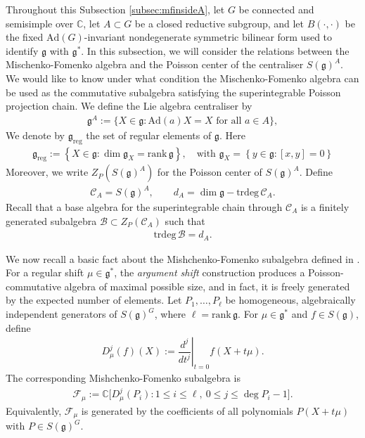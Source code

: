 \documentclass[11pt,reqno]{amsart}
\newtheorem*{theorem A}{Main Theorem A}
\newtheorem*{theorem B}{Main Theorem B}
\newtheorem*{theorem C}{Main Theorem C}
\newtheorem*{theorem D}{Main Theorem D}
\theoremstyle{definition}
\theoremstyle{plain}
\theoremstyle{conclusion}
\begin{document}
Throughout this Subsection \ref{subsec:mfinsideA}, let $G$ be connected and semisimple over $\mathbb{C}$, let $A \subset G$ be a closed reductive subgroup, and let $B (\cdot,\cdot)$ be the fixed $\mathrm{Ad}(G)$-invariant nondegenerate symmetric bilinear form used to identify $\mathfrak{g}$ with $\mathfrak{g}^*$. In this subsection, we will consider the relations between the  Mischenko-Fomenko algebra and the Poisson center of the centraliser $S(\mathfrak{g})^A$. We would like to know under what condition the Mischenko-Fomenko algebra can be used as the commutative subalgebra satisfying the superintegrable Poisson projection chain. We define the Lie algebra centraliser by  \begin{align*}
\mathfrak{g}^A := \{X \in \mathfrak{g} : \mathrm{Ad}(a)X = X \text{ for all } a \in A\},
\end{align*}
We denote by $\mathfrak{g}_{\mathrm{reg}}$ the set of regular elements of $\mathfrak{g}$.  Here \begin{align*}
    \mathfrak{g}_{\mathrm{reg}} := \left\{X \in \mathfrak{g} : \dim \mathfrak{g}_X=\mathrm{rank} \,\mathfrak{g}\right\}, \quad \text{with } \mathfrak{g}_X = \left\{y\in \mathfrak{g}: [x,y] = 0\right\}
\end{align*}Moreover, we write $Z_P(S(\mathfrak{g})^A)$ for the Poisson center of $S(\mathfrak{g})^A$. Define \begin{align*}
\mathcal{C}_A = S(\mathfrak{g})^A, \qquad d_A = \dim \mathfrak{g} - \mathrm{trdeg} \,\mathcal{C}_A.
\end{align*}
Recall that a base algebra for the superintegrable chain through $\mathcal{C}_A$ is a finitely generated subalgebra $\mathcal{B} \subset Z_P(\mathcal{C}_A)$ such that
\begin{align*}
\mathrm{trdeg} \, \mathcal{B} = d_A.
\end{align*}

 

We now recall a basic fact about the Mishchenko-Fomenko subalgebra defined in \cite{MF78}. For a regular shift $\mu \in \mathfrak{g}^*$, the \textit{argument shift} construction produces a Poisson-commutative algebra of maximal possible size, and in fact, it is freely generated by the expected number of elements. Let $P_1,\dots,P_\ell$ be homogeneous, algebraically independent generators of $S(\mathfrak{g})^G$, where $\ell = \mathrm{rank} \, \mathfrak{g}$. For $\mu \in \mathfrak{g}^*$ and $f \in S(\mathfrak{g})$, define \begin{align*}
D_\mu^j(f)(X) := \left.\dfrac{d^j}{dt^j}\right\vert_{t= 0} f(X + t\mu).
\end{align*} %
The corresponding Mishchenko-Fomenko subalgebra is
\begin{align*}
\mathcal{F}_\mu := \mathbb{C}\big[D_\mu^j(P_i) : 1 \leq i \leq \ell,\ 0 \leq j \leq \deg P_i - 1\big].
\end{align*}
Equivalently, $\mathcal{F}_\mu$ is generated by the coefficients of all polynomials $P(X+t\mu)$ with $P \in S(\mathfrak{g})^G$. 
\end{document}
